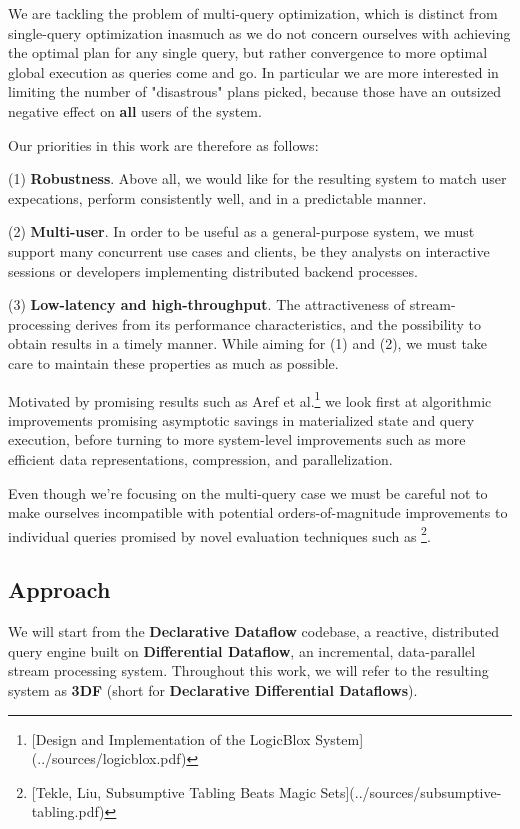 \documentclass[../index.tex]{subfiles}
\begin{document}
We are tackling the problem of multi-query optimization, which is
distinct from single-query optimization inasmuch as we do not concern
ourselves with achieving the optimal plan for any single query, but
rather convergence to more optimal global execution as queries come
and go. In particular we are more interested in limiting the number of
"disastrous" plans picked, because those have an outsized negative
effect on \textbf{all} users of the system.

Our priorities in this work are therefore as follows:

(1) \textbf{Robustness}. Above all, we would like for the resulting system
to match user expecations, perform consistently well, and in a
predictable manner.

(2) \textbf{Multi-user}. In order to be useful as a general-purpose system,
we must support many concurrent use cases and clients, be they
analysts on interactive sessions or developers implementing
distributed backend processes.

(3) \textbf{Low-latency and high-throughput}. The attractiveness of
stream-processing derives from its performance characteristics, and
the possibility to obtain results in a timely manner. While aiming for
(1) and (2), we must take care to maintain these properties as much as
possible.

Motivated by promising results such as Aref et al.\footnote{[Design and Implementation of the LogicBlox System](../sources/logicblox.pdf)} we look first at
algorithmic improvements promising asymptotic savings in materialized
state and query execution, before turning to more system-level
improvements such as more efficient data representations, compression,
and parallelization.

Even though we're focusing on the multi-query case we must be careful
not to make ourselves incompatible with potential orders-of-magnitude
improvements to individual queries promised by novel evaluation
techniques such as \footnote{[Tekle, Liu, Subsumptive Tabling Beats Magic Sets](../sources/subsumptive-tabling.pdf)}.

\subsection{Approach}

We will start from the \textbf{Declarative Dataflow} codebase, a reactive,
distributed query engine built on \textbf{Differential Dataflow}, an
incremental, data-parallel stream processing system. Throughout this
work, we will refer to the resulting system as \textbf{3DF} (short for
\textbf{Declarative Differential Dataflows}).
\end{document}
